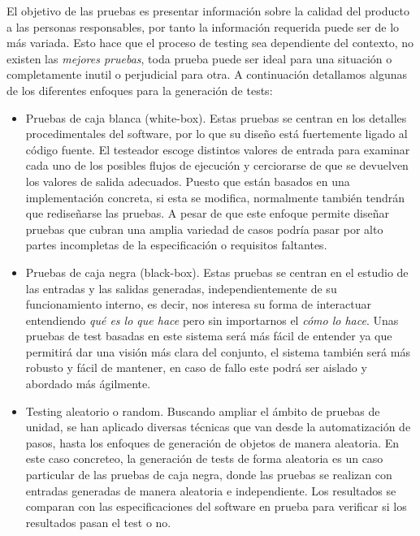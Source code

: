 El objetivo de las pruebas es presentar informaci\'on sobre la calidad del producto a las personas responsables, por tanto la informaci\'on requerida puede ser de lo m\'as variada. Esto hace que el proceso de testing sea dependiente del contexto, no existen las {\it mejores pruebas}, toda prueba puede ser ideal para una situaci\'on o completamente inutil o perjudicial para otra. A continuaci\'on detallamos algunas de los diferentes enfoques para la generaci\'on de tests:
\begin{itemize}
\item Pruebas de caja blanca (white-box). Estas pruebas se centran en los detalles procedimentales del software, por lo que su dise\~no est\'a fuertemente ligado al c\'odigo fuente. El testeador escoge distintos valores de entrada para examinar cada uno de los posibles flujos de ejecuci\'on y cerciorarse de que se devuelven los valores de salida adecuados. Puesto que est\'an basados en una implementaci\'on concreta, si esta se modifica, normalmente tambi\'en tendr\'an que redise\~narse las pruebas. A pesar de que este enfoque permite dise\~nar pruebas que cubran una amplia variedad de casos podr\'ia pasar por alto partes incompletas de la especificaci\'on o requisitos faltantes.
\item Pruebas de caja negra (black-box). Estas pruebas se centran en el estudio de las entradas y las salidas generadas, independientemente de su funcionamiento interno, es decir, nos interesa su forma de interactuar entendiendo {\it qu\'e es lo que hace} pero sin importarnos el {\it c\'omo lo hace}. Unas pruebas de test basadas en este sistema ser\'a m\'as f\'acil de entender ya que permitir\'a dar una visi\'on m\'as clara del conjunto, el sistema tambi\'en ser\'a m\'as robusto y f\'acil de mantener, en caso de fallo este podr\'a ser aislado y abordado m\'as \'agilmente.
\item Testing aleatorio o random. Buscando ampliar el \'ambito de pruebas de unidad, se han aplicado diversas t\'ecnicas que van desde la automatizaci\'on de pasos, hasta los enfoques de generaci\'on de objetos de manera aleatoria. En este caso concreteo, la generaci\'on de tests de forma aleatoria es un caso particular de las pruebas de caja negra, donde las pruebas se realizan con entradas generadas de manera aleatoria e independiente. Los resultados se comparan con las especificaciones del software en prueba para verificar si los resultados pasan el test o no.

\end{itemize}

